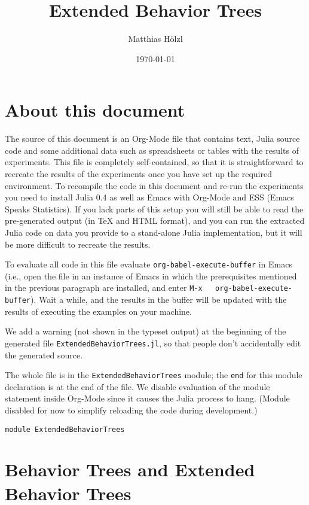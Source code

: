 \documentclass[a4wide]{article}
\author{Matthias Hölzl}
\date{\today}
\title{Extended Behavior Trees}
\begin{document}
\maketitle
\tableofcontents


\section{About this document}
\label{sec-1}

The source of this document is an Org-Mode file that contains text,
Julia source code and some additional data such as spreadsheets or
tables with the results of experiments.  This file is completely
self-contained, so that it is straightforward to recreate the
results of the experiments once you have set up the required
environment.  To recompile the code in this document and re-run the
experiments you need to install Julia 0.4 as well as Emacs with
Org-Mode and ESS (Emacs Speaks Statistics).  If you lack parts of
this setup you will still be able to read the pre-generated output
(in \TeX{} and HTML format), and you can run the extracted Julia code
on data you provide to a stand-alone Julia implementation, but it
will be more difficult to recreate the results.

To evaluate all code in this file evaluate
\verb~org-babel-execute-buffer~ in Emacs (i.e., open the file in an
instance of Emacs in which the prerequisites mentioned in the
previous paragraph are installed, and enter \verb~M-x   org-babel-execute-buffer~).  Wait a while, and the results in the
buffer will be updated with the results of executing the examples on
your machine.

We add a warning (not shown in the typeset output) at the beginning
of the generated file \verb~ExtendedBehaviorTrees.jl~, so that people
don't accidentally edit the generated source.

The whole file is in the \verb~ExtendedBehaviorTrees~ module; the \verb~end~
for this module declaration is at the end of the file.  We disable
evaluation of the module statement inside Org-Mode since it causes
the Julia process to hang.  (Module disabled for now to simplify
reloading the code during development.)

\begin{verbatim}
module ExtendedBehaviorTrees
\end{verbatim}



\section{Behavior Trees and Extended Behavior Trees}
\label{sec-2}
\end{document}
